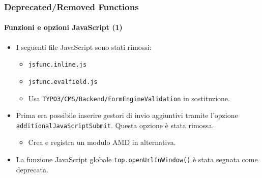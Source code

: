 
\begin{frame}[fragile]
	\frametitle{Deprecated/Removed Functions}
	\framesubtitle{Funzioni e opzioni JavaScript (1)}

	\begin{itemize}
		\item I seguenti file JavaScript sono stati rimossi:

			\begin{itemize}
				\item \texttt{jsfunc.inline.js}
				\item \texttt{jsfunc.evalfield.js}
			\end{itemize}

			\begin{itemize}\smaller
				\item[\ding{228}] Usa \texttt{TYPO3/CMS/Backend/FormEngineValidation} in sostituzione.
			\end{itemize}\normalsize

		\item Prima era possibile inserire gestori di invio aggiuntivi tramite l'opzione \texttt{additionalJavaScriptSubmit}.
			Questa opzione è stata rimossa.

			\begin{itemize}\smaller
				\item[\ding{228}] Crea e registra un modulo AMD in alternativa.
			\end{itemize}\normalsize

		\item La funzione JavaScript globale \texttt{top.openUrlInWindow()} è stata segnata come deprecata.

	\end{itemize}

\end{frame}


